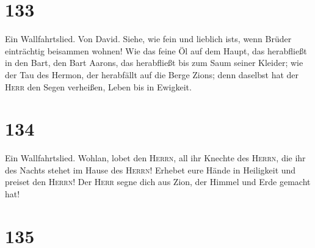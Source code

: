 \hypertarget{section-132}{%
\section{133}\label{section-132}}

 Ein Wallfahrtslied. Von David. Siehe, wie fein und
lieblich ist\textquotesingle s, wenn Brüder einträchtig beisammen
wohnen!  Wie das feine Öl auf dem Haupt, das herabfließt
in den Bart, den Bart Aarons, das herabfließt bis zum Saum seiner
Kleider;  wie der Tau des Hermon, der herabfällt auf die
Berge Zions; denn daselbst hat der \textsc{Herr} den Segen verheißen,
Leben bis in Ewigkeit.

\hypertarget{section-133}{%
\section{134}\label{section-133}}

 Ein Wallfahrtslied. Wohlan, lobet den \textsc{Herrn}, all
ihr Knechte des \textsc{Herrn}, die ihr des Nachts stehet im Hause des
\textsc{Herrn}!  Erhebet eure Hände in Heiligkeit und
preiset den \textsc{Herrn}!  Der \textsc{Herr} segne dich
aus Zion, der Himmel und Erde gemacht hat!

\hypertarget{section-134}{%
\section{135}\label{section-134}}

